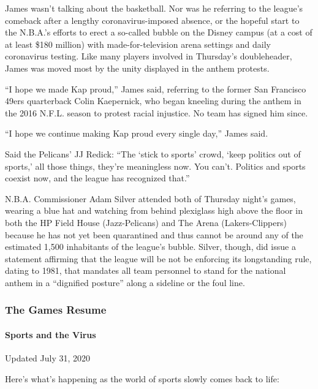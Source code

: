 James wasn't talking about the basketball. Nor was he referring to the
league's comeback after a lengthy coronavirus-imposed absence, or the
hopeful start to the N.B.A.'s efforts to erect a so-called bubble on the
Disney campus (at a cost of at least \$180 million) with
made-for-television arena settings and daily coronavirus testing. Like
many players involved in Thursday's doubleheader, James was moved most
by the unity displayed in the anthem protests.

``I hope we made Kap proud,'' James said, referring to the former San
Francisco 49ers quarterback Colin Kaepernick, who began kneeling during
the anthem in the 2016 N.F.L. season to protest racial injustice. No
team has signed him since.

``I hope we continue making Kap proud every single day,'' James said.

Said the Pelicans' JJ Redick: ``The `stick to sports' crowd, `keep
politics out of sports,' all those things, they're meaningless now. You
can't. Politics and sports coexist now, and the league has recognized
that.''

N.B.A. Commissioner Adam Silver attended both of Thursday night's games,
wearing a blue hat and watching from behind plexiglass high above the
floor in both the HP Field House (Jazz-Pelicans) and The Arena
(Lakers-Clippers) because he has not yet been quarantined and thus
cannot be around any of the estimated 1,500 inhabitants of the league's
bubble. Silver, though, did issue a statement affirming that the league
will be not be enforcing its longstanding rule, dating to 1981, that
mandates all team personnel to stand for the national anthem in a
``dignified posture'' along a sideline or the foul line.

\hypertarget{the-games-resume}{%
\subsubsection{The Games Resume}\label{the-games-resume}}

\hypertarget{sports-and-the-virus}{%
\paragraph{Sports and the Virus}\label{sports-and-the-virus}}

Updated July 31, 2020

Here's what's happening as the world of sports slowly comes back to
life:

